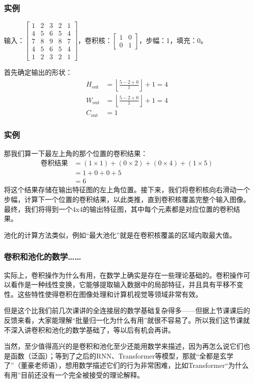 \documentclass[fontset=none]{ctexbeamer}
\begin{document}
\begin{frame}
    \frametitle{实例}

    输入：$\begin{bmatrix}1 & 2 & 3 & 2& 1 \\
4 & 5 & 6 & 5 & 4 \\
7 & 8 & 9 & 8 & 7 \\
4 & 5 & 6 & 5 & 4 \\
1 & 2 & 3 & 2 & 1\end{bmatrix}$，卷积核：$\begin{bmatrix}1 & 0 \\
0 & 1\end{bmatrix}$，步幅：1，填充：0。

首先确定输出的形状：
\begin{align}
H_\text{out} &= \left\lfloor \frac{5 - 2 + 0}{1} \right\rfloor + 1 = 4 \\
W_\text{out} &= \left\lfloor \frac{5 - 2 + 0}{1} \right\rfloor + 1 = 4 \\
C_\text{out} &= 1
\end{align}

\end{frame}

\begin{frame}
    \frametitle{实例}

    那我们算一下最左上角的那个位置的卷积结果：
\begin{align}
\text{卷积结果} &= (1 \times 1) + (0 \times 2) + (0 \times 4) + (1 \times 5) \\
&= 1 + 0 + 0 + 5 \\
&= 6
\end{align}
将这个结果存储在输出特征图的左上角位置。接下来，我们将卷积核向右滑动一个步幅，计算下一个位置的卷积结果，以此类推，直到卷积核覆盖完整个输入图像。最终，我们将得到一个4x4的输出特征图，其中每个元素都是对应位置的卷积结果。

池化的计算方法类似，例如“最大池化”就是在卷积核覆盖的区域内取最大值。

\end{frame}

\begin{frame}
    \frametitle{卷积和池化的数学……}

    实际上，卷积操作为什么有用，在数学上确实是存在一些理论基础的。卷积操作可以看作是一种线性变换，它能够提取输入数据中的局部特征，并且具有平移不变性。这些特性使得卷积在图像处理和计算机视觉等领域非常有效。

    但是这个比我们前几次课讲的全连接层的数学基础复杂得多——但据上节课课后的反馈来看，大家能理解“批量归一化为什么有用”就很不容易了。所以我们这节课就不深入讲卷积和池化的数学基础了，等以后有机会再讲。

    当然，至少值得高兴的是卷积和池化至少还能用数学来描述，因为再怎么说它们也是函数（泛函）；等到了之后的RNN、Transformer等模型，那就“全都是玄学了”（董豪老师语），想用数学描述它们的行为非常困难，比如Transformer“为什么有用”目前还没有一个完全被接受的理论解释。

\end{frame}
\end{document}
